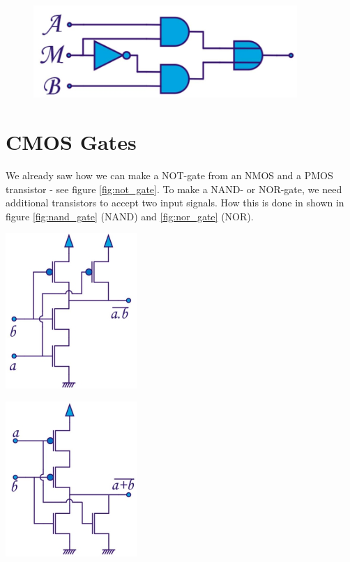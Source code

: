 \begin{figure}[h!]
	\centering
	\includegraphics[width=10cm]{figures/ch13/mux3.jpg}
	\caption{}
	\label{fig:mux3}
\end{figure}

\section{CMOS Gates}
We already saw how we can make a NOT-gate from an NMOS and a PMOS transistor - see figure \ref{fig:not_gate}. To make a NAND- or NOR-gate, we need additional transistors to accept two input signals. How this is done in shown in figure \ref{fig:nand_gate} (NAND) and \ref{fig:nor_gate} (NOR).

\begin{minipage}{.5\textwidth}
	\centering
	\includegraphics[width=5cm]{figures/ch13/nand_gate.jpg}
	\label{fig:nand_gate}
\end{minipage}%
\begin{minipage}{.5\textwidth}
	\centering
	\includegraphics[width=5cm]{figures/ch13/nor_gate.jpg}
	\label{fig:nor_gate}
\end{minipage}

